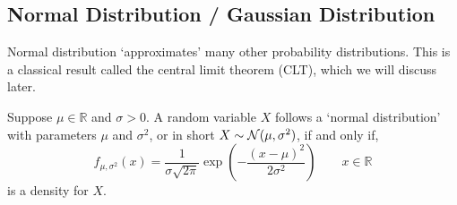 \subsection{Normal Distribution / Gaussian Distribution}
Normal distribution `approximates' many other probability distributions. This
is a classical result called the central limit theorem (CLT), which we will
discuss later.
\begin{definition}
Suppose $\mu \in \mathbb{R}$ and $\sigma > 0$. A random variable $X$ follows a
`normal distribution' with parameters $\mu$ and $\sigma^2$, or in short $X
\sim \mathcal{N}(\mu, \sigma^2)$, if and only if,
\[
    f_{\mu, \sigma^2}(x) = \frac{1}{\sigma \sqrt{2\pi}} 
        \exp \left( -\frac{(x - \mu)^2}{2\sigma^2} \right)
        \qquad x \in \mathbb{R} 
\]
is a density for $X$.
\end{definition}


